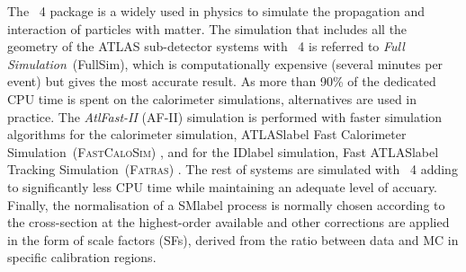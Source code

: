 The \GEANT~4 package %
is a widely used in physics to simulate the propagation and interaction of particles with matter. The simulation that includes all the geometry of the \acrshort{ATLAS} sub-detector systems with \GEANT~4 is referred to \textit{Full Simulation}~(FullSim), which is computationally expensive (several minutes per event) but gives the most accurate result. As more than 90\% of the dedicated CPU time is spent on the calorimeter simulations, alternatives are used in practice. The \textit{AtlFast-II} (AF-II) simulation is performed with faster simulation algorithms for the calorimeter simulation, \acrshort{ATLASlabel} Fast Calorimeter Simulation~(\textsc{FastCaloSim}) %
, and for the \acrshort{IDlabel} simulation, Fast \acrshort{ATLASlabel} Tracking Simulation~(\textsc{Fatras}) %
. The rest of systems are simulated with \GEANT~4 adding to significantly less CPU time while maintaining an adequate level of accuary. Finally, the normalisation of a \acrshort{SMlabel} process is normally chosen according to the cross-section at the highest-order available and other corrections are applied in the form of scale factors (SFs), derived from the ratio between data and \acrshort{MC} in specific calibration regions.

